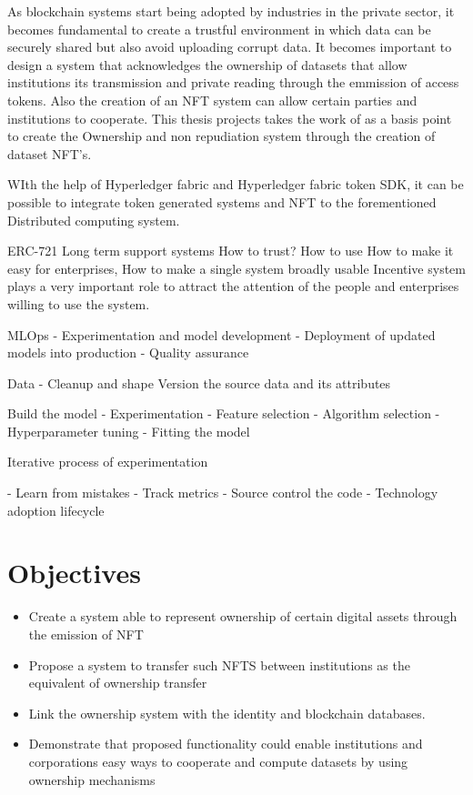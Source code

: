 As blockchain systems start being adopted by industries in the private sector, it becomes fundamental to create a trustful environment in which data can be securely shared but also avoid uploading corrupt data.
It becomes important to design a system that acknowledges the ownership of datasets that allow institutions its transmission and private reading through the emmission of access tokens. Also the creation of an NFT system can allow certain parties and institutions to cooperate. This thesis projects takes the work of \cite{holme2020secure} as a basis point to create the Ownership and non repudiation system through the creation of dataset \ac{NFT}'s.

WIth the help of Hyperledger fabric and Hyperledger fabric token SDK, it can be possible to integrate token generated systems and NFT to the forementioned Distributed computing system.

ERC-721
Long term support systems
How to trust?
How to use
How to make it easy for enterprises, 
How to make a single system broadly usable
Incentive system plays a very important role to attract the attention of the people and enterprises willing to use the system.

MLOps
- Experimentation and model development
- Deployment of updated models  into production
- Quality assurance


Data - Cleanup and shape
Version the source data and its attributes


Build the model  - Experimentation
- Feature selection
- Algorithm selection
- Hyperparameter tuning
- Fitting the model


Iterative process of experimentation

- Learn from mistakes
- Track metrics
- Source control the code
- Technology adoption lifecycle


\section{Objectives}

\begin{itemize}
\item Create a system able to represent ownership of certain digital assets through the emission of \ac{NFT}
\item Propose a system to transfer such NFTS between institutions as the equivalent of ownership transfer
\item Link the ownership system with the identity and blockchain databases.
\item Demonstrate that proposed functionality could enable institutions and corporations easy ways to cooperate and compute datasets by using ownership mechanisms
\end{itemize}


